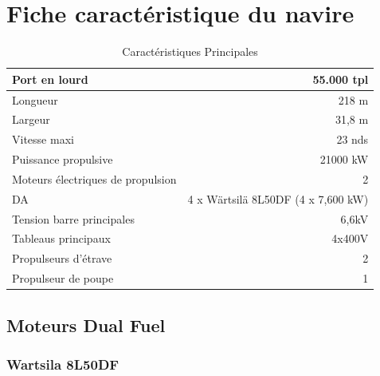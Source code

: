 \documentclass[12pt,a4paper]{article}
\begin{document}
\pagestyle{fancy}
\section{Fiche caractéristique du navire }
\begin{table}[htbp]
\begin{tabular}{|l|r|}
\hline
Port en lourd & 55.000 tpl \\ \hline
Longueur & 218 m \\ \hline
Largeur & 31,8 m \\ \hline
Vitesse maxi & 23 nds \\ \hline
Puissance propulsive & 21000 kW \\ \hline
Moteurs électriques de propulsion & 2 \\ \hline
DA & 4 x Wärtsilä 8L50DF (4 x 7,600 kW) \\ \hline
Tension barre principales & 6,6kV \\ \hline
Tableaus principaux & 4x400V \\ \hline
Propulseurs d'étrave & 2 \\ \hline
Propulseur de poupe & 1 \\ \hline
\end{tabular}
\caption{Caractéristiques Principales}
\label{}
\end{table}


\subsection{Moteurs Dual Fuel}

\subsubsection{Wartsila 8L50DF}
\end{document}
